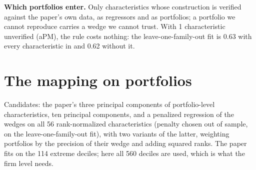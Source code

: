 \documentclass[11pt]{article}
\begin{document}
\textbf{Which portfolios enter.} Only characteristics whose construction is
verified against the paper's own data, as regressors and as portfolios; a
portfolio we cannot reproduce carries a wedge we cannot trust. With
1 characteristic unverified (aPM), the rule costs
nothing: the leave-one-family-out fit is 0.63 with every characteristic in
and 0.62 without it.

\section{The mapping on portfolios}

Candidates: the paper's three principal components of portfolio-level
characteristics, ten principal components, and a penalized regression of
the wedges on all 56 rank-normalized characteristics (penalty chosen out of
sample, on the leave-one-family-out fit), with two variants of the latter,
weighting portfolios by the precision of their wedge and adding squared
ranks. The paper fits on the 114 extreme deciles; here all 560 deciles are
used, which is what the firm level needs.
\end{document}
